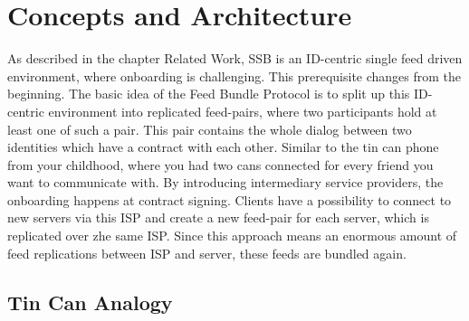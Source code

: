 \chapter{Concepts and Architecture}
As described in the chapter Related Work, SSB is an ID-centric single feed driven environment, where onboarding is challenging. 
This prerequisite changes from the beginning. The basic idea of the Feed Bundle Protocol is to split up this ID-centric environment into replicated feed-pairs, where two participants hold at least one of such a pair.  This pair contains the whole dialog between two identities which have a contract with each other. Similar to the tin can phone from your childhood, where you had two cans connected for every friend you want to communicate with. By introducing intermediary service providers, the onboarding happens at contract signing. Clients have a possibility to connect to new servers via this ISP and create a new feed-pair for each server, which is replicated over zhe same ISP. Since this approach means an enormous amount of feed replications between ISP and server, these feeds are bundled again.

\section{Tin Can Analogy}

